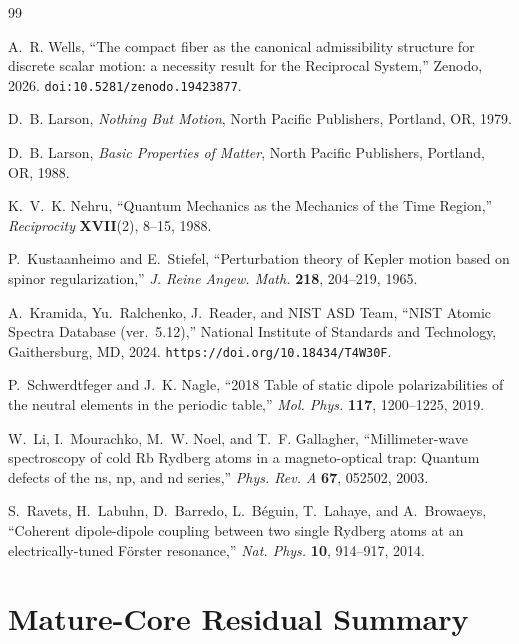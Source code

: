 \documentclass[11pt,a4paper]{article}
\begin{document}
\begin{thebibliography}{99}

A.~R. Wells,
``The compact fiber as the canonical admissibility structure for discrete scalar motion: a necessity result for the Reciprocal System,''
Zenodo, 2026.
\texttt{doi:10.5281/zenodo.19423877}.


D.~B. Larson,
\emph{Nothing But Motion},
North Pacific Publishers, Portland, OR, 1979.

D.~B. Larson,
\emph{Basic Properties of Matter},
North Pacific Publishers, Portland, OR, 1988.

K.~V.~K. Nehru,
``Quantum Mechanics as the Mechanics of the Time Region,''
\emph{Reciprocity} \textbf{XVII}(2), 8--15, 1988.

P.~Kustaanheimo and E.~Stiefel,
``Perturbation theory of Kepler motion based on spinor regularization,''
\emph{J. Reine Angew. Math.} \textbf{218}, 204--219, 1965.

A.~Kramida, Yu.~Ralchenko, J.~Reader, and NIST ASD Team,
``NIST Atomic Spectra Database (ver.~5.12),''
National Institute of Standards and Technology, Gaithersburg, MD, 2024.
\texttt{https://doi.org/10.18434/T4W30F}.

P.~Schwerdtfeger and J.~K. Nagle,
``2018 Table of static dipole polarizabilities of the neutral elements in the periodic table,''
\emph{Mol. Phys.} \textbf{117}, 1200--1225, 2019.

W.~Li, I.~Mourachko, M.~W. Noel, and T.~F. Gallagher,
``Millimeter-wave spectroscopy of cold Rb Rydberg atoms in a magneto-optical trap: Quantum defects of the ns, np, and nd series,''
\emph{Phys. Rev. A} \textbf{67}, 052502, 2003.

S.~Ravets, H.~Labuhn, D.~Barredo, L.~B\'eguin, T.~Lahaye, and A.~Browaeys,
``Coherent dipole-dipole coupling between two single Rydberg atoms at an electrically-tuned F\"orster resonance,''
\emph{Nat. Phys.} \textbf{10}, 914--917, 2014.

\end{thebibliography}

\appendix

\section{Mature-Core Residual Summary}
\label{app:residuals}
\end{document}
